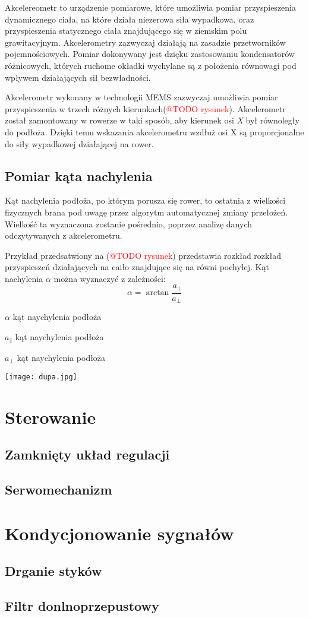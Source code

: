 Akcelereometr to urządzenie pomiarowe, które umożliwia pomiar przyspieszenia dynamicznego ciała, na które działa niezerowa siła wypadkowa, oraz przyspieszenia statycznego ciała znajdującego się w ziemskim polu grawitacyjnym. Akcelerometry zazwyczaj działają na zasadzie przetworników pojemnościowych. Pomiar dokonywany jest dzięku zastosowaniu kondensatorów różnicowych, których ruchome okładki wychylane są z położenia równowagi pod wpływem działających sił bezwładności.

Akcelerometr wykonany w technologii MEMS zazwyczaj umożliwia pomiar przyspieszenia w trzech różnych kierunkach(\textcolor{red}{@TODO rysunek}). Akcelerometr został zamontowany w rowerze w taki sposób, aby kierunek osi \textit{X} był równoległy do podłoża. Dzięki temu wskazania akcelerometru wzdłuż osi X są proporcjonalne do siły wypadkowej działającej na rower.



\subsection{Pomiar kąta nachylenia}
Kąt nachylenia podłoża, po którym porusza się rower, to ostatnia z wielkości fizycznych brana pod uwagę przez algorytm automatycznej zmiany przełożeń. Wielkość ta wyznaczona zostanie pośrednio, poprzez analizę danych odczytywanych z akcelerometru. 

Przykład przedsatwiony na (\textcolor{red}{@TODO rysunek}) przedstawia rozkład rozkład przyspieszeń działających na caiło znajdujące się na równi pochyłej. Kąt nachylenia $\alpha$ można wyznaczyć z zależności:
\begin{equation}
\alpha=\arctan{\frac{a_{\parallel }}{a_{\bot }}}
\end{equation}
\begin{eqwhere}[2cm]
	\item[$\alpha$] kąt naychylenia podłoża
	\item[$a_{\parallel }$] kąt naychylenia podłoża
	\item[$a_{\bot }$] kąt naychylenia podłoża
\end{eqwhere}
\begin{center}
\texttt{[image: dupa.jpg]}
\end{center}
\section{Sterowanie}


\subsection{Zamknięty układ regulacji}
\subsection{Serwomechanizm}

\section{Kondycjonowanie sygnałów}


\subsection{Drganie styków}
\subsection{Filtr donlnoprzepustowy}
